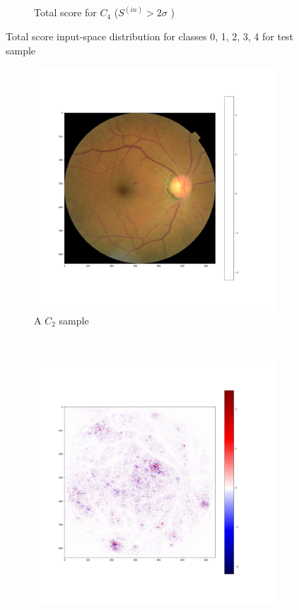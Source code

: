\documentclass[preprint]{elsarticle}
\theoremstyle{definition} %
\theoremstyle{remark}
\begin{document}
\begin{figure}[h!]
\begin{subfigure}[b]{0.43\textwidth}
		\caption{Total score for $C_4$ ($ S^{(in)} > 2\sigma$ )}
		\label{fig:score_total_c4_2std}
	\end{subfigure}
	\caption{Total score input-space distribution for classes 0, 1, 2, 3, 4 for test sample}
	\label{fig:test1_score_total}
\end{figure}

\begin{figure}[h!]
	\centering
	\begin{subfigure}[b]{0.45\textwidth}
		\includegraphics[width=\textwidth]{figures/class_maps/3250_right_1.png}
		\caption{A $C_2$ sample}
	\end{subfigure}~
	\begin{subfigure}[b]{0.45\textwidth}		
		\includegraphics[width=\textwidth]{figures/class_maps/3250_right_2.png}

\end{subfigure}
\end{figure}
\end{document}
